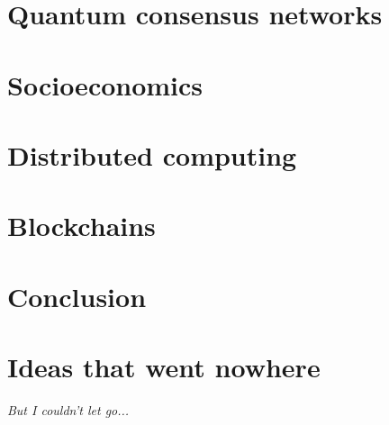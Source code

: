 \documentclass[twocolumn, aps, amsmath, amssymb, nofootinbib, superscriptaddress, longbibliography, floatfix, eqsecnum, rmp]{revtex4-2}
\begin{document}
\section{Quantum consensus networks} \label{sec:QCN}


\section{Socioeconomics} \label{sec:economics}


\section{Distributed computing} \label{sec:distributed_computing}


\section{Blockchains} \label{sec:blockchains}


\section{Conclusion} \label{sec:conclusion}





%

\section{Ideas that went nowhere} \label{sec:ideas_nowhere.tex}
\begin{center}\emph{But I couldn't let go...}\end{center}

\end{document}
